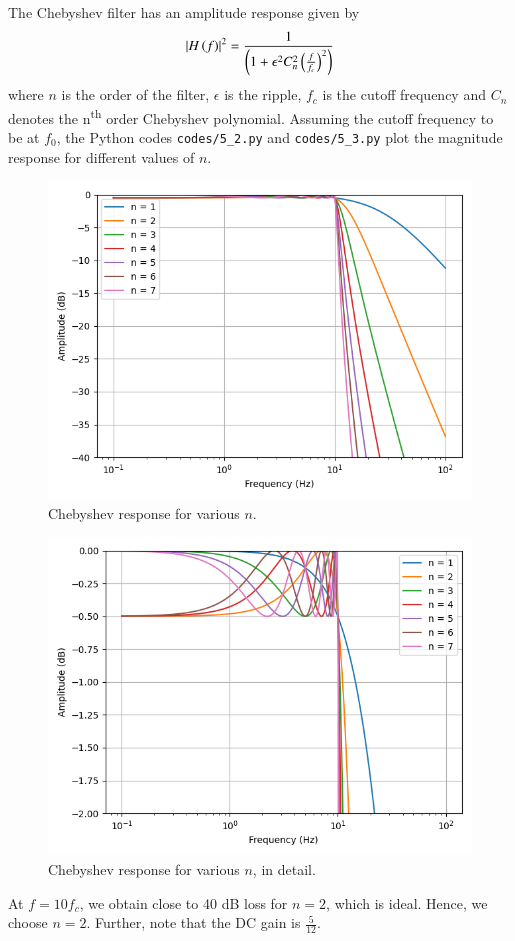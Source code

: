 \documentclass[journal,12pt,twocolumn]{IEEEtran}
\renewcommand\thesection{\arabic{section}}
\begin{document}
\begin{enumerate}[label=\thesection.\arabic*
,ref=\thesection.\theenumi]
\solution The Chebyshev filter has an amplitude response
given by
\begin{align}
    \left\vert H\left(f\right)\right\vert^2 = \frac{1}{\left(1 + \epsilon^2C_n^2\left(\frac{f}{f_c}\right)^2\right)}
\end{align}
where $n$ is the order of the filter, $\epsilon$ is the
ripple, $f_c$ is the cutoff frequency and $C_n$ denotes 
the n\textsuperscript{th} order Chebyshev polynomial. 
Assuming the cutoff frequency to be at $f_0$, the Python 
codes \texttt{codes/5\_2.py} and \texttt{codes/5\_3.py} plot
the magnitude response for different values of $n$.
\begin{figure}[!ht]
    \includegraphics[width=\columnwidth]{figs/5_2.png}
    \caption{Chebyshev response for various $n$.}
    \label{fig:cheby-resp}
\end{figure}
\begin{figure}[!ht]
    \includegraphics[width=\columnwidth]{figs/5_3.png}
    \caption{Chebyshev response for various $n$, in detail.}
    \label{fig:cheby-resp-zoom}
\end{figure}
At $f = 10f_c$, we obtain close to 40 dB loss for $n = 2$, 
which is ideal. Hence, we choose $n = 2$. Further, note that
the DC gain is $\frac{5}{12}$.


\end{enumerate}
\end{document}
